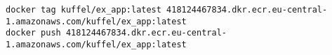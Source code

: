\lstset{language=bash}
\begin{lstlisting}[frame=htrbl, caption={Image nach ECR pushen}, label={lst:terraform_docker_push}]
docker tag kuffel/ex_app:latest 418124467834.dkr.ecr.eu-central-1.amazonaws.com/kuffel/ex_app:latest
docker push 418124467834.dkr.ecr.eu-central-1.amazonaws.com/kuffel/ex_app:latest
\end{lstlisting}